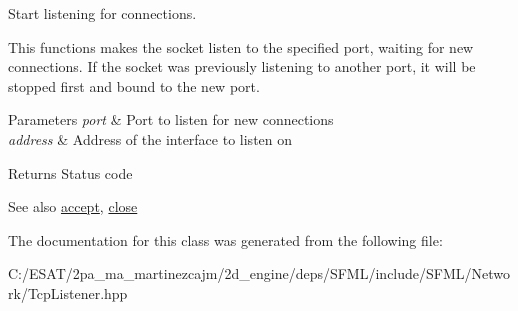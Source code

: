 Start listening for connections. 

This functions makes the socket listen to the specified port, waiting for new connections. If the socket was previously listening to another port, it will be stopped first and bound to the new port.


\begin{DoxyParams}{Parameters}
{\em port} & Port to listen for new connections \\
\hline
{\em address} & Address of the interface to listen on\\
\hline
\end{DoxyParams}
\begin{DoxyReturn}{Returns}
Status code
\end{DoxyReturn}
\begin{DoxySeeAlso}{See also}
\hyperlink{classsf_1_1_tcp_listener_ae2c83ce5a64d50b68180c46bef0a7346}{accept}, \hyperlink{classsf_1_1_tcp_listener_a3a00a850506bd0f9f48867a0fe59556b}{close} 
\end{DoxySeeAlso}


The documentation for this class was generated from the following file\+:\begin{DoxyCompactItemize}
\item 
C\+:/\+E\+S\+A\+T/2pa\+\_\+ma\+\_\+martinezcajm/2d\+\_\+engine/deps/\+S\+F\+M\+L/include/\+S\+F\+M\+L/\+Network/Tcp\+Listener.\+hpp\end{DoxyCompactItemize}
